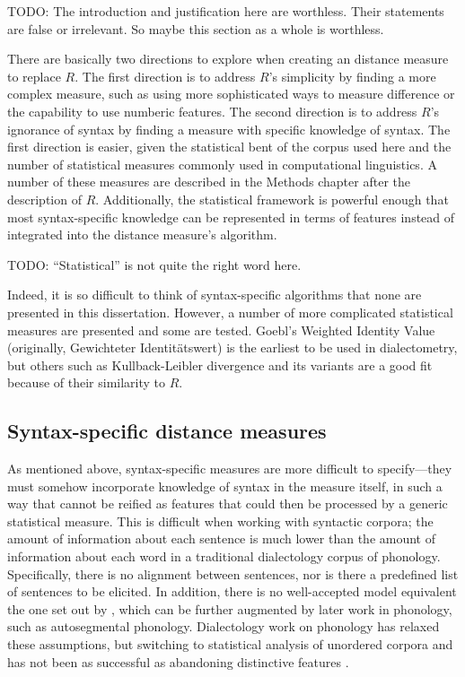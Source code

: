 TODO: The introduction and justification here are worthless. Their
statements are false or irrelevant. So maybe this section as a whole
is worthless.

There are basically two directions to explore when creating an
distance measure to replace $R$. The first direction is to address
$R$'s simplicity by finding a more complex measure, such as using more
sophisticated ways to measure difference or the capability to use
numberic features. The second direction is to address $R$'s ignorance
of syntax by finding a measure with specific knowledge of syntax. The
first direction is easier, given the statistical bent of the corpus
used here and the number of statistical measures commonly used in
computational linguistics. A number of these measures are described in
the Methods chapter after the description of $R$.  Additionally, the
statistical framework is powerful enough that most syntax-specific
knowledge can be represented in terms of features instead of
integrated into the distance measure's algorithm.

TODO: ``Statistical'' is not quite the right word here.

Indeed, it is so difficult to think of syntax-specific algorithms that
none are presented in this dissertation. However, a number of more
complicated statistical measures are presented and some are tested. Goebl's
Weighted Identity Value (originally, Gewichteter Identit\"atswert) is
the earliest to be used in dialectometry, but others such as
Kullback-Leibler divergence and its variants are a good fit because of
their similarity to $R$.

\subsection{Syntax-specific distance measures}

As mentioned above, syntax-specific measures are more difficult to
specify---they must somehow incorporate knowledge of syntax in the
measure itself, in such a way that cannot be reified as features that
could then be processed by a generic statistical measure. This is
difficult when working with syntactic corpora; the amount of
information about each sentence is much lower than the amount of
information about each word in a traditional dialectology corpus of
phonology. Specifically, there is no alignment between sentences, nor is
there a predefined list of sentences to be elicited. In addition,
there is no well-accepted model equivalent the one set out by
, which can be further augmented by later work in
phonology, such as  autosegmental
phonology. Dialectology work on phonology has relaxed these
assumptions, but switching to statistical analysis of unordered
corpora \cite{sanders06} and \cite{hinrichs07} has not
been as successful as abandoning distinctive features \cite{heeringa04}.

